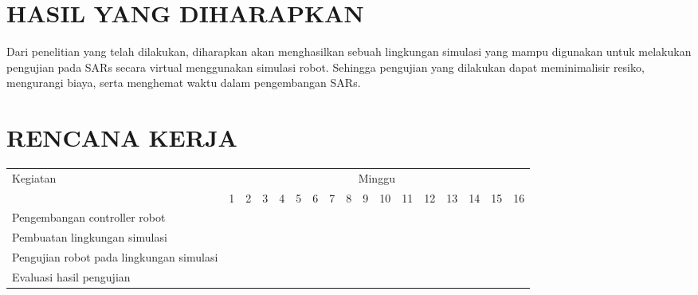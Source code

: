 \section{HASIL YANG DIHARAPKAN}

Dari penelitian yang telah dilakukan, diharapkan akan menghasilkan sebuah lingkungan simulasi yang mampu digunakan untuk melakukan pengujian pada SARs secara virtual menggunakan simulasi robot.
Sehingga pengujian yang dilakukan dapat meminimalisir resiko, mengurangi biaya, serta menghemat waktu dalam pengembangan SARs.

\section{RENCANA KERJA}

\newcommand{\w}{}
\newcommand{\G}{\cellcolor{gray}}
\begin{table}[h!]
  \begin{tabular}{|p{3.5cm}|c|c|c|c|c|c|c|c|c|c|c|c|c|c|c|c|}

    \hline
    \multirow{2}{*}{Kegiatan} & \multicolumn{16}{|c|}{Minggu} \\
    \cline{2-17} &
    1 & 2 & 3 & 4 & 5 & 6 & 7 & 8 & 9 & 10 & 11 & 12 & 13 & 14 & 15 & 16 \\
    \hline

    Pengembangan controller robot &
    \G & \G & \G & \G & \G & \G & \w & \w & \w & \w & \w & \w & \w & \w & \w & \w \\
    \hline

    Pembuatan lingkungan simulasi &
    \w & \w & \w & \w & \w & \w & \G & \G & \G & \G & \w & \w & \w & \w & \w & \w \\
    \hline

    Pengujian robot pada lingkungan simulasi &
    \w & \w & \w & \w & \w & \w & \w & \w & \w & \w & \G & \G & \G & \G & \w & \w \\
    \hline

    Evaluasi hasil pengujian &
    \w & \w & \w & \w & \w & \w & \w & \w & \w & \w & \w & \w & \w & \w & \G & \G \\
    \hline

  \end{tabular}
\end{table}